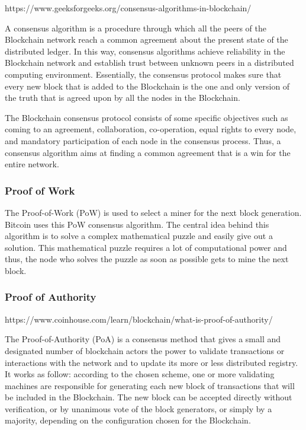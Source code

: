 https://www.geeksforgeeks.org/consensus-algorithms-in-blockchain/

A consensus algorithm is a procedure through which all the peers of the Blockchain network reach a common agreement about the present state of the distributed ledger. In this way, consensus algorithms achieve reliability in the Blockchain network and establish trust between unknown peers in a distributed computing environment. Essentially, the consensus protocol makes sure that every new block that is added to the Blockchain is the one and only version of the truth that is agreed upon by all the nodes in the Blockchain.

The Blockchain consensus protocol consists of some specific objectives such as coming to an agreement, collaboration, co-operation, equal rights to every node, and mandatory participation of each node in the consensus process. Thus, a consensus algorithm aims at finding a common agreement that is a win for the entire network.

\subsubsection{Proof of Work}

The Proof-of-Work (PoW) is used to select a miner for the next block generation. Bitcoin uses this PoW consensus algorithm. The central idea behind this algorithm is to solve a complex mathematical puzzle and easily give out a solution. This mathematical puzzle requires a lot of computational power and thus, the node who solves the puzzle as soon as possible gets to mine the next block. 

\subsubsection{Proof of Authority}

https://www.coinhouse.com/learn/blockchain/what-is-proof-of-authority/

The Proof-of-Authority (PoA) is a consensus method that gives a small and designated number of blockchain actors the power to validate transactions or interactions with the network and to update its more or less distributed registry. It works as follow: according to the chosen scheme, one or more validating machines are responsible for generating each new block of transactions that will be included in the Blockchain. The new block can be accepted directly without verification, or by unanimous vote of the block generators, or simply by a majority, depending on the configuration chosen for the Blockchain.
